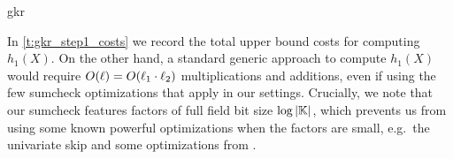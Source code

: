 \begin{lncsappendix}{gkr}
 
\bigskip

In \cref{t:gkr_step1_costs} we record the total upper bound costs for computing $h_1(X)$.  On the other hand, a standard generic approach to compute $h_{1}(X)$ would require $O(\ell)=O(\ell_1\cdot \ell_2)$ multiplications and additions, even if using the few  sumcheck optimizations that apply in our settings. %
 Crucially, we note that our sumcheck features factors of full field bit size $\log|\mathbb{K}|$, which prevents us from using some known powerful optimizations when the factors are small, e.g.\ the univariate skip \cite{gruen} and some optimizations from \cite{sumcheck_opt_2}. %

 




\end{lncsappendix}
